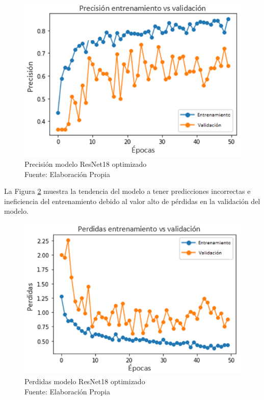\begin{figure}[ht]
	\centering
	\includegraphics[scale=0.7]{Figs/512.png}
	\caption{Precisión modelo ResNet18 optimizado\\Fuente: Elaboración Propia}
	\label{fig:preci_RES_OPT}
\end{figure}

La Figura \ref{fig:perdda_REs_opt} muestra la tendencia del modelo a tener predicciones incorrectas e ineficiencia del entrenamiento debido al valor alto de pérdidas en la validación del modelo. 

\newpage
\begin{figure}[ht]
	\centering
	\includegraphics[scale=0.7]{Figs/513.png}
	\caption{Perdidas modelo ResNet18 optimizado\\Fuente: Elaboración Propia}
	\label{fig:perdda_REs_opt}
\end{figure}

